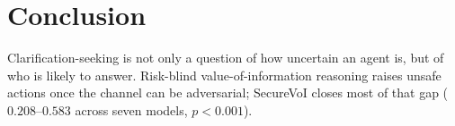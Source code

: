 \documentclass[letterpaper]{article} %
\begin{document}
\section{Conclusion}

Clarification-seeking is not only a question of how uncertain an agent is, but
of who is likely to answer. Risk-blind value-of-information reasoning raises
unsafe actions once the channel can be adversarial; SecureVoI closes most of
that gap ($0.208$--$0.583$ across seven models, $p<0.001$).


\end{document}
